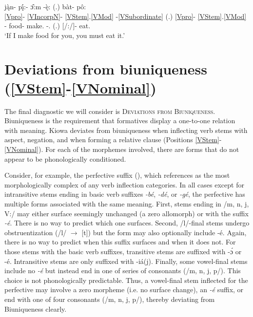 \documentclass[output=paper]{langscibook}
\begin{document}
\ea \label{food}
\glll j\k{\`a}n- p\k{í}:- \^{ɔ}:m -\k{è}: (.) b\`at- pô:\\
{\ref{Vpro}}- \ref{VIncorpN}- \ref{VStem}.\ref{VMod} -\ref{VSubordinate} (.) {\ref{Vpro}}- \ref{VStem}.\ref{VMod}\\
[(\Second,\Third\Sg/\Aarg):\First\Sg/\Parg:\Pl/\Obj]- food- make.{\Imp} -{\When}.{\Diff} (.) [\Second\Sg/\Aarg:\Pl/\Obj]- eat.{\Imp}  \\
\trans `If I make food for you, you must eat it.' \citep[][100]{Miller:2018}
\z 

\section{Deviations from biuniqueness (\ref{VStem}-\ref{VNominal})} \label{biuniqueness}

The final diagnostic we will consider is {\textsc{Deviations from Biuniqueness}}. Biuniqueness is the requirement that formatives display a one-to-one relation with meaning. Kiowa deviates from biuniqueness when inflecting verb stems with aspect, negation, and when forming a relative clause (Positions \ref{VStem}-\ref{VNominal}). For each of the morphemes involved, there are forms that do not appear to be phonologically conditioned. 

Consider, for example, the perfective suffix (), which \citet{Watkins:1984} references as the most morphologically complex of any verb inflection categories. In all cases except for intransitive stems ending in basic verb suffixes \textit{-bé}, \textit{-dé}, or \textit{-gé}, the perfective has multiple forms associated with the same meaning. First, stems ending in /m, n, j, V:/ may either surface seemingly unchanged (a zero allomorph) or with the suffix \textit{-é}. There is no way to predict which one surfaces. Second, /l/-final stems undergo obstruentization (/l/ $\rightarrow$ [t]) but the form may also optionally include -é. Again, there is no way to predict when this suffix surfaces and when it does not. For those stems with the basic verb suffixes, transitive stems are suffixed with -\'{ɔ} or -é. Intransitive stems are only suffixed with -iá(j). Finally, some vowel-final stems include no \textit{-é} but instead end in one of series of consonants (/m, n, j, p/). This choice is not phonologically predictable. Thus, a vowel-final stem inflected for the perfective may involve a zero morpheme (i.e. no surface change), an \textit{-é} suffix, or end with one of four consonants (/m, n, j, p/), thereby deviating from Biuniqueness clearly.
\end{document}
